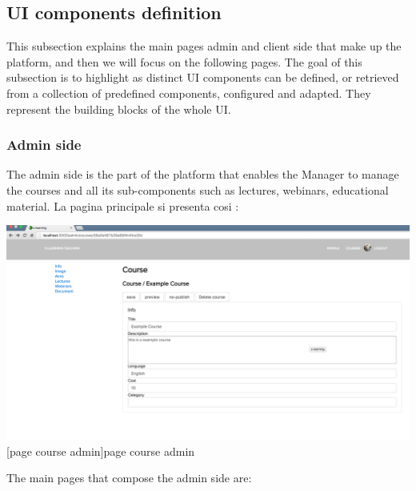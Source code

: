 \subsection {UI components definition}
\label{subsec:components_definition}
This subsection explains the main pages admin and client side that make up the platform, and then we will focus on the following pages.
The goal of this subsection is to highlight as distinct UI components can be defined, or retrieved from a collection of predefined components, configured and adapted. They represent the building blocks of the whole UI.


\subsubsection {Admin side}
\label{subsec:Admin_side}
The admin side is the part of the platform that enables the Manager to manage the courses and all its sub-components such as lectures, webinars, educational material.
La pagina principale si presenta cosi :

\begin{minipage}{\linewidth}
    \centering
    \includegraphics[width=1.0\linewidth]{images/chapter4/page-course-admin.png}
    [page course admin]{page course admin}
\end{minipage}


The main pages that compose the admin side are:

